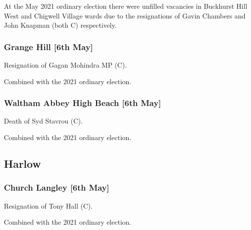 \documentclass[a4paper,openany]{book}
\begin{document}
\begin{resultsiii}
At the May 2021 ordinary election there were unfilled vacancies in Buckhurst Hill West and Chigwell Village wards due to the resignations of Gavin Chambers and John Knapman (both C) respectively.

\subsubsection*{Grange Hill \hspace*{\fill}\nolinebreak[1]%
	\enspace\hspace*{\fill}
	[6th May]}


Resignation of Gagan Mohindra MP (C).

Combined with the 2021 ordinary election.

\subsubsection*{Waltham Abbey High Beach \hspace*{\fill}\nolinebreak[1]%
	\enspace\hspace*{\fill}
	[6th May]}


Death of Syd Stavrou (C).

Combined with the 2021 ordinary election.

\subsection*{Harlow}

\subsubsection*{Church Langley \hspace*{\fill}\nolinebreak[1]%
	\enspace\hspace*{\fill}
	[6th May]}


Resignation of Tony Hall (C).

Combined with the 2021 ordinary election.


\end{resultsiii}
\end{document}
